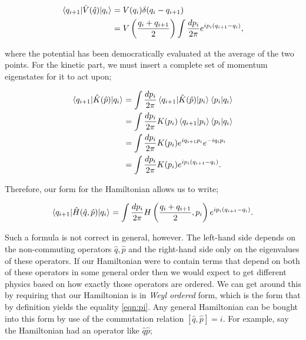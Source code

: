 \begin{equation}
\begin{split}
\mathinner{\langle q_{i+1}\vert\hat{V}(\hat{q})\vert q_i\rangle}_{} &= V(q_i) \delta(q_i - q_{i+1}) \\
&= V \left(\frac{q_i + q_{i+1}}{2} \right) \int \frac{d p_i}{2 \pi} e^{i p_i(q_{i+1} - q_i)},
\end{split}
\end{equation}

where the potential has been democratically evaluated at the average of the two points. For the kinetic part, we must insert a complete set of momentum eigenstates for it to act upon;

\begin{equation}
\begin{split}
\mathinner{\langle q_{i+1}\vert\hat{K}(\hat{p})\vert q_i\rangle}_{} & = \int \frac{dp_i}{2 \pi} \mathinner{\langle q_{i+1}\vert\hat{K}(\hat{p})\vert p_i\rangle}_{}\left<p_i|q_i \right> \\
&= \int \frac{dp_i}{2 \pi}K(p_i) \left<q_{i+1}|p_i \right> \left<p_i|q_i \right> \\
&= \int \frac{dp_i}{2 \pi}K(p_i) e^{i q_{i+1}p_i} e^{-i q_i p_i}  \\
&= \int \frac{dp_i}{2 \pi}K(p_i) e^{i p_i(q_{i+1}-q_i)}.
\end{split}
\end{equation}

Therefore, our form for the Hamiltonian allows us to write;

\begin{equation}
\label{eqn:pi}
\mathinner{\langle q_{i+1}\vert\hat{H}(\hat{q}, \hat{p})\vert q_i\rangle}_{} = \int \frac{d p_i}{2 \pi} H\left(\frac{q_i + q_{i+1}}{2}, p_i \right) e^{i p_i (q_{i+1}-q_i)}.
\end{equation}

Such a formula is not correct in general, however. The left-hand side depends on the non-commuting operators $\hat{q}, \hat{p}$ and the right-hand side only on the eigenvalues of these operators. If our Hamiltonian were to contain terms that depend on both of these operators in some general order then we would expect to get different physics based on how exactly those operators are ordered. We can get around this by requiring that our Hamiltonian is in \emph{Weyl ordered} form, which is the form that by definition yields the equality \ref{eqn:pi}. Any general Hamiltonian can be bought into this form by use of the commutation relation $[\hat{q}, \hat{p}] = i$. For example, say the Hamiltonian had an operator like $\hat{q} \hat{p}$;

